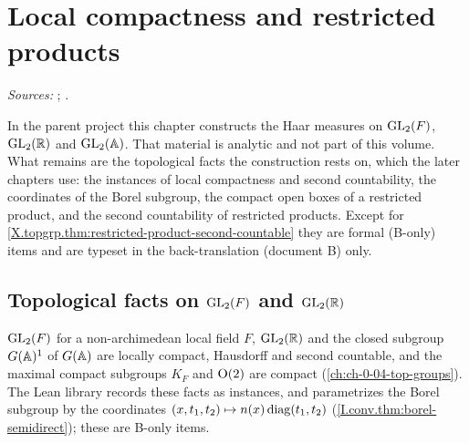 
\chapter{Local compactness and restricted products}\label{ch:ch-0-06-haar}

\noindent\emph{Sources:} \cite[§3.3]{Corv-ptIII-1}; \cite[§1]{AIntro}.

\noindent In the parent project this chapter constructs the Haar measures on $\mathrm{GL}_2(F)$, $\mathrm{GL}_2(\mathbb{R})$ and $\mathrm{GL}_2(\mathbb{A})$. That material is
analytic and not part of this volume. What remains are the topological facts the construction rests on, which the later chapters use:
the instances of local compactness and second countability, the coordinates of the Borel subgroup, the compact open boxes of a restricted
product, and the second countability of restricted products. Except for \cref{X.topgrp.thm:restricted-product-second-countable} they are
formal (B-only) items and are typeset in the back-translation (document B) only.

\section{\texorpdfstring{Topological facts on $\mathrm{GL}_2(F)$ and $\mathrm{GL}_2(\mathbb{R})$}{Topological facts on GL2(F) and GL2(R)}}\label{sec:haar-local}

\noindent $\mathrm{GL}_2(F)$ for a non-archimedean local field $F$, $\mathrm{GL}_2(\mathbb{R})$ and the closed subgroup $G(\mathbb{A})^1$ of $G(\mathbb{A})$ are locally compact,
Hausdorff and second countable, and the maximal compact subgroups $K_F$ and $\mathrm{O}(2)$ are compact (\cref{ch:ch-0-04-top-groups}). The Lean
library records these facts as instances, and parametrizes the Borel subgroup by the coordinates $(x,t_1,t_2)\mapsto n(x)\operatorname{diag}(t_1,t_2)$
(\cref{I.conv.thm:borel-semidirect}); these are B-only items.

